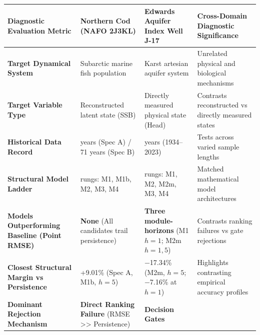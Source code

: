 \documentclass[11pt]{article}
\begin{document}
{\def\LTcaptype{none} %
\begin{longtable}[]{@{}
  >{\raggedright\arraybackslash}p{}
  >{\raggedright\arraybackslash}p{}
  >{\raggedright\arraybackslash}p{}
  >{\raggedright\arraybackslash}p{}@{}}
\toprule\noalign{}
\begin{minipage}[b]{\linewidth}\raggedright
Diagnostic Evaluation Metric
\end{minipage} & \begin{minipage}[b]{\linewidth}\raggedright
Northern Cod (NAFO 2J3KL)
\end{minipage} & \begin{minipage}[b]{\linewidth}\raggedright
Edwards Aquifer Index Well J-17
\end{minipage} & \begin{minipage}[b]{\linewidth}\raggedright
Cross-Domain Diagnostic Significance
\end{minipage} \\
\midrule\noalign{}
\endhead
\bottomrule\noalign{}
\endlastfoot
\textbf{Target Dynamical System} & Subarctic marine fish population &
Karst artesian aquifer system & Unrelated physical and biological
mechanisms \\
\textbf{Target Variable Type} & Reconstructed latent state (SSB) &
Directly measured physical state (Head) & Contrasts reconstructed vs
directly measured states \\
\textbf{Historical Data Record} & 33 years (Spec A) / 71 years (Spec B)
& 90 years (1934--2023) & Tests across varied sample lengths \\
\textbf{Structural Model Ladder} & 5 rungs: M1, M1b, M2, M3, M4 & 5
rungs: M1, M2, M2m, M3, M4 & Matched mathematical model architectures \\
\textbf{Models Outperforming Baseline (Point RMSE)} & \textbf{None} (All
candidates trail persistence) & \textbf{Three module-horizons} (M1
\(h=1\); M2m \(h=1, 5\)) & Contrasts ranking failures vs gate
rejections \\
\textbf{Closest Structural Margin vs Persistence} & +9.01\% (Spec A,
M1b, \(h = 5\)) & −17.34\% (M2m, \(h = 5\); −7.16\% at \(h = 1\)) &
Highlights contrasting empirical accuracy profiles \\
\textbf{Dominant Rejection Mechanism} & \textbf{Direct Ranking Failure}
(RMSE \textgreater\textgreater{} Persistence) & \textbf{Decision Gates
}
\end{longtable}}
\end{document}

